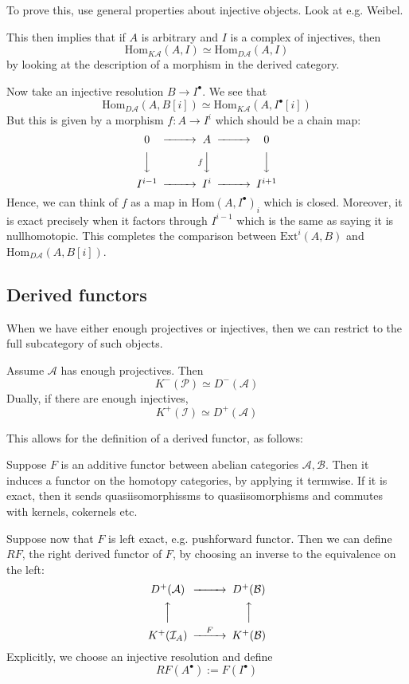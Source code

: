 To prove this, use general properties about injective objects. Look at e.g. Weibel.

This then implies that if $A$ is arbitrary and $I$ is a complex of injectives, then $$\mathrm{Hom}_{K\mathcal{A}}(A,I)\simeq \mathrm{Hom}_{D\mathcal{A}}(A,I)$$by looking at the description of a morphism in the derived category.

Now take an injective resolution $B\rightarrow I^\bullet$. We see that $$\mathrm{Hom}_{D\mathcal{A}}(A,B[i])\simeq \mathrm{Hom}_{K\mathcal{A}}(A,I^\bullet[i])$$But this is given by a morphism $f:A\rightarrow I^i$ which should be a chain map: 
$$\begin{CD}0 @> > > A @> > > 0 \\ @VVV @VfVV @VVV \\ I^{i-1} @> > > I^i @> > > I^{i+1} \end{CD}$$
Hence, we can think of $f$ as a map in $\mathrm{Hom}(A, I^\bullet)_{i}$ which is closed. Moreover, it is exact precisely when it factors through $I^{i-1}$ which is the same as saying it is nullhomotopic. This completes the comparison between $\mathrm{Ext}^i(A,B)$ and $\mathrm{Hom}_{D\mathcal{A}}(A,B[i])$. 

\subsection{Derived functors}
When we have either enough projectives or injectives, then we can restrict to the full subcategory of such objects. 

\begin{theorem}{}{}
    Assume $\mathcal{A}$ has enough projectives. Then $$K^{-}(\mathcal{P})\simeq D^{-}(\mathcal{A})$$Dually, if there are enough injectives, $$K^{+}(\mathcal{I})\simeq D^{+}(\mathcal{A})$$
\end{theorem}

This allows for the definition of a derived functor, as follows:

Suppose $F$ is an additive functor between abelian categories $\mathcal{A}, \mathcal{B}$. Then it induces a functor on the homotopy categories, by applying it termwise. If it is exact, then it sends quasiisomorphissms to quasiisomorphisms and commutes with kernels, cokernels etc.

Suppose now that $F$ is left exact, e.g. pushforward functor. Then we can define $RF$, the right derived functor of $F$, by choosing an inverse to the equivalence on the left:  $$\begin{CD} D^+(\mathcal{A)} @> > > D^+(\mathcal{B)} \\ @A A A  @A A A \\ K^+(\mathcal{I}_{A})@> F> >K^+(\mathcal{B}) \end{CD}$$
Explicitly, we choose an injective resolution and define $$RF(A^\bullet):=F(I^\bullet)$$

